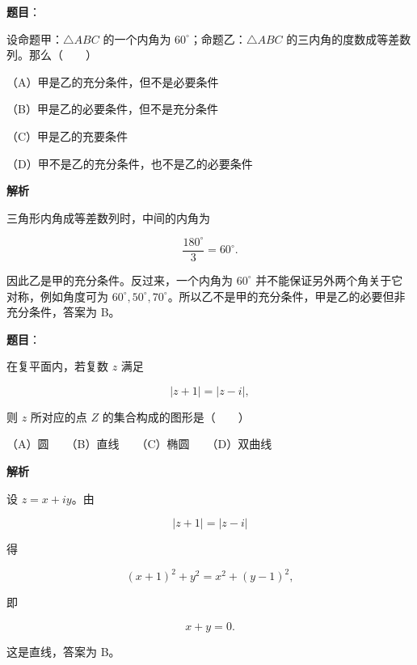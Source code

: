 \begin{answer}

\textbf{题目}：

设命题甲：$\triangle ABC$ 的一个内角为 $60^\circ$；命题乙：$\triangle ABC$ 的三内角的度数成等差数列。那么\mbox{（　　）}

（A）甲是乙的充分条件，但不是必要条件

（B）甲是乙的必要条件，但不是充分条件

（C）甲是乙的充要条件

（D）甲不是乙的充分条件，也不是乙的必要条件

\textbf{解析}

三角形内角成等差数列时，中间的内角为

\nopagebreak[4]
\[
\frac{180^\circ}{3}=60^\circ.
\]

因此乙是甲的充分条件。反过来，一个内角为 $60^\circ$ 并不能保证另外两个角关于它对称，例如角度可为 $60^\circ,50^\circ,70^\circ$。所以乙不是甲的充分条件，甲是乙的必要但非充分条件，答案为 B。


\end{answer}
\begin{answer}

\textbf{题目}：

在复平面内，若复数 $z$ 满足

\nopagebreak[4]
\[
|z+1|=|z-i|,
\]

则 $z$ 所对应的点 $Z$ 的集合构成的图形是\mbox{（　　）}

（A）圆　　（B）直线　　（C）椭圆　　（D）双曲线

\textbf{解析}

设 $z=x+iy$。由

\nopagebreak[4]
\[
|z+1|=|z-i|
\]

得

\nopagebreak[4]
\[
(x+1)^2+y^2=x^2+(y-1)^2,
\]

即

\nopagebreak[4]
\[
x+y=0.
\]

这是直线，答案为 B。


\end{answer}
